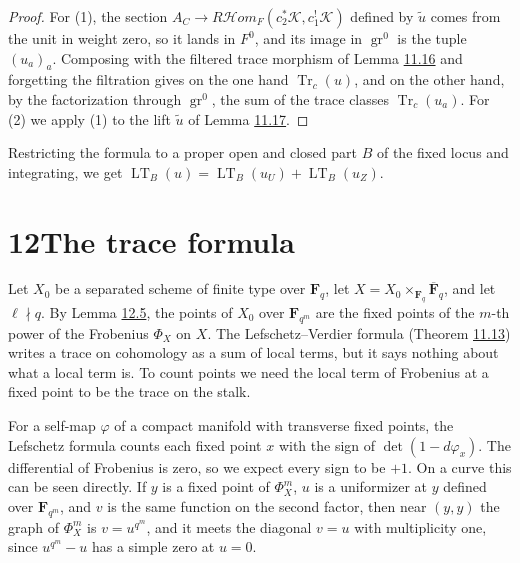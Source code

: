 \documentclass[11pt]{article}
\providecommand{\cHom}{}\renewcommand{\cHom}{R\mathcal{H}\!om}
\begin{document}
\begin{proof}[{Proof}]\label{bp224}%
For (1), the section \(A_C\to\cHom_F(c_2^*\mathcal K,c_1^!\mathcal K)\) defined by \(\tilde u\) comes from the unit in weight zero, so it lands in \(F^0\), and its image in \(\operatorname{gr}^0\) is the tuple \((u_a)_a\). Composing with the filtered trace morphism of Lemma \hyperref[bp214]{11.16} and forgetting the filtration gives on the one hand \(\operatorname{Tr}_c(u)\), and on the other hand, by the factorization through \(\operatorname{gr}^0\), the sum of the trace classes \(\operatorname{Tr}_c(u_a)\). For (2) we apply (1) to the lift \(\tilde u\) of Lemma \hyperref[bp217]{11.17}.
\end{proof}

\label{bp225}%
Restricting the formula to a proper open and closed part \(B\) of the fixed locus and integrating, we get \(\operatorname{LT}_B(u)=\operatorname{LT}_B(u_U)+\operatorname{LT}_B(u_Z)\).



\section*{\texorpdfstring{12\quad The trace formula}{12 The trace formula}}
\label{bp226}%
\label{bp227}%
Let \(X_0\) be a separated scheme of finite type over \(\mathbf F_q\), let \(X=X_0\times_{\mathbf F_q}\overline{\mathbf F}_q\), and let \(\ell\nmid q\). By Lemma \hyperref[bp240]{12.5}, the points of \(X_0\) over \(\mathbf F_{q^m}\) are the fixed points of the \(m\)-th power of the Frobenius \(\Phi_X\) on \(X\). The Lefschetz–Verdier formula (Theorem \hyperref[bp206]{11.13}) writes a trace on cohomology as a sum of local terms, but it says nothing about what a local term is. To count points we need the local term of Frobenius at a fixed point to be the trace on the stalk.

For a self-map \(\varphi\) of a compact manifold with transverse fixed points, the Lefschetz formula counts each fixed point \(x\) with the sign of \(\det(1-d\varphi_x)\). The differential of Frobenius is zero, so we expect every sign to be \(+1\). On a curve this can be seen directly. If \(y\) is a fixed point of \(\Phi_X^m\), \(u\) is a uniformizer at \(y\) defined over \(\mathbf F_{q^m}\), and \(v\) is the same function on the second factor, then near \((y,y)\) the graph of \(\Phi_X^m\) is \(v=u^{q^m}\), and it meets the diagonal \(v=u\) with multiplicity one, since \(u^{q^m}-u\) has a simple zero at \(u=0\).
\end{document}
